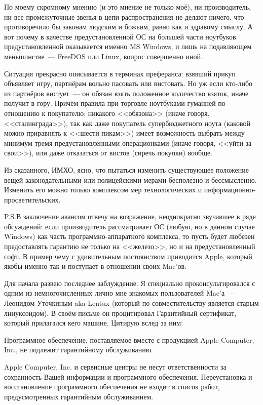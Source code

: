 По моему скромному мнению (и это мнение не только моё), ни производитель, ни все промежуточные звенья в цепи распространения не делают ничего, что противоречило бы законам людским и божьим, равно как и здравому смыслу. А вот почему в качестве предустановленной ОС на большей части ноутбуков предустановленной оказывается именно MS Windows, и лишь на подавляющем меньшинстве~--- FreeDOS или Linux, вопрос совершенно иной.

Ситуация прекрасно описывается в терминах преферанса: взявший прикуп объявляет игру, партнёрам вольно пасовать или вистовать. Но уж если кто-либо из партнёров вистует~--- он обязан взять положенное количество взяток, иначе получит в гору. Причём правила при торговле ноутбуками гуманней по отношению к покупателю: никакого <<обязона>> (иначе говоря, <<сталинграда>>), так как даже покупатель супербюджетного ноута (каковой можно приравнять к <<шести пикам>>) имеет возможность выбрать между минимум тремя предустановленными операционками (иначе говоря, <<уйти за свои>>), или даже отказаться от вистов (сиречь покупки) вообще.

Из сказанного, ИМХО, ясно, что пытаться изменить существующее положение вещей законодательными или полицейскими мерами бесполезно и бессмысленно. Изменить его можно только комплексом мер технологических и информационно-просветительских.

P.S.В заключение авансом отвечу на возражение, неоднократно звучавшее в ряде обсуждений: если производитель рассматривает ОС (любую, но в данном случае Windows) как часть программно-аппаратного комплекса, то пусть будет любезен предоставлять гарантию не только на <<железо>>, но и на предустановленный софт. В пример чему с удивительным постоянством приводится Apple, который якобы именно так и поступает в отношении своих Mac'ов.

Для начала развею последнее заблуждение. Я специально проконсультировался с одним из немногочисленных лично мне знакомых пользователей Mac'а~--- Леонидом Уточкиным aka Lentux (который по совместительству является старым линуксоидом). В своём письме он процитировал Гарантийный сертификат, который прилагался кего машине. Цитирую вслед за ним:

\begin{shadequote}{}
Программное обеспечение, поставляемое вместе с продукцией Apple Computer, Inc., не подлежит гарантийному обслуживанию.

Apple Computer, Inc. и сервисные центры не несут ответственности за сохранность Вашей информации и программного обеспечения. Переустановка и восстановление программного обеспечения не входит в список работ, предусмотренных гарантийным обслуживанием.
\end{shadequote}


